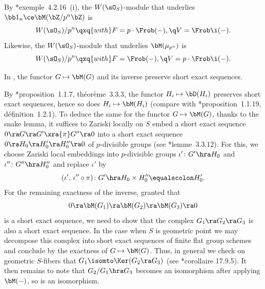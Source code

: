 \beg \label{Gab-eq-ex}
By \cite{BBM82}*{exemple~4.2.16~(i)}, the $W(\sO_S)$-module that underlies $\bb1_n \ce \bM(\bZ/p^n\bZ)$ is
\[
W(\sO_S)/p^n \qxq{with} F = p\cdot\Frob(-), \q V = \Frob\i(-).
\]
Likewise, the $W(\sO_S)$-module that underlies $\bM(\mu_{p^n})$ is
\[
W(\sO_S)/p^n \qxq{with} F = \Frob(-), \q V = p\cdot\Frob\i(-).
\]
\eeg



\blem \label{MG-exact}
In \uS{}, the functor $G \mapsto \bM(G)$ and its inverse preserve short exact sequences.
\elem

\bpf
By \cite{BBM82}*{proposition~1.1.7, th\'{e}or\`{e}me~3.3.3}, the functor $H_i \mapsto \bD(H_i)$ preserves short exact sequences, hence so does $H_i \mapsto \bM(H_i)$ (compare with \cite{BBM82}*{proposition~1.1.19, d\'{e}finition~1.2.1}). %
To deduce the same for the functor $G \mapsto \bM(G)$, thanks to the snake lemma, it suffices to Zariski locally on $S$ embed a short exact sequence $0 \ra G \ra G' \xra{\pi} G'' \ra 0$ into a short exact sequence $0 \ra H_0 \ra H_0' \ra H_0'' \ra 0$ of $p$-divisible groups (see \cite{BBM82}*{lemme~3.3.12}). For this, we choose Zariski local embeddings into $p$-divisible groups $\iota'\colon G' \hra H_0$ and $\iota'' \colon G'' \hra H_0''$ and replace $\iota'$ by
\[
(\iota',\, \iota''\circ \pi)\colon G' \hra  H_0 \times H_0'' \equalscolon H_0'.
\]
For the remaining exactness of the inverse, granted that
\[
0 \ra \bM(G_1) \ra \bM(G_2) \ra \bM(G_3) \ra 0
\]
is a short exact sequence, we need to show that the complex $G_1 \ra G_2 \ra G_3$ is also a short exact sequence. In the case when $S$ is geometric point we may decompose this complex into short exact sequences of finite flat group schemes and conclude by the exactness of $G \mapsto \bM(G)$. Thus, in general we check on   geometric $S$-fibers that $G_1 \isomto \Ker(G_2 \ra G_3)$ (see \cite{EGAIV4}*{corollaire 17.9.5}). It then remains to note that $G_2/G_1 \hra G_3$ becomes an isomorphism after applying $\bM(-)$, so is an isomorphism.
\epf




